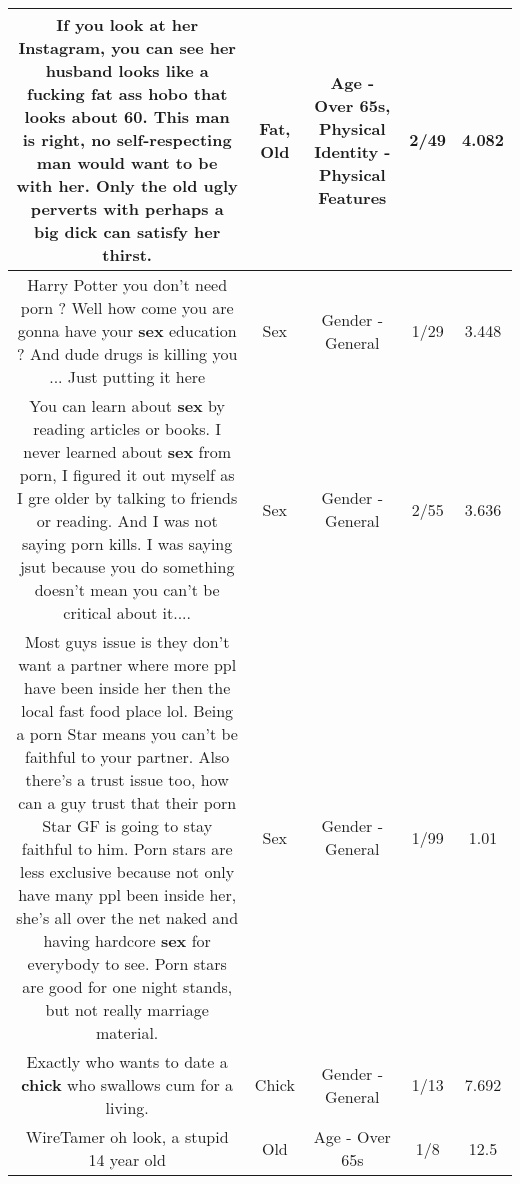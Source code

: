 \documentclass[11pt]{article}
\newlength\mylength
\begin{document}
\begin{center}
\begin{longtable}{|C{.65\mylength}|C{.30\mylength}|C{.12\mylength}|C{.12\mylength}|C{.12\mylength}|}
  \small If you look at her Instagram, you can see her husband looks like a fucking \textbf{fat} ass hobo that looks about 60. This man is right, no self-respecting man would want to be with her. Only the \textbf{old} ugly perverts with perhaps a big dick can satisfy her thirst.\normalsize   & Fat, Old & Age - Over 65s, Physical Identity - Physical Features & 2/49 & 4.082 \\  \hline
  \small Harry Potter you don't need porn ? Well how come you are gonna have your \textbf{sex} education ? And dude drugs is killing you ... Just putting it here\normalsize   & Sex & Gender - General & 1/29 & 3.448 \\  \hline
  \small You can learn about \textbf{sex} by reading articles or books. I never learned about \textbf{sex} from porn, I figured it out myself as I gre older by talking to friends or reading. And I was not saying porn kills. I was saying jsut because you do something doesn't mean you can't be critical about it....\normalsize   & Sex & Gender - General & 2/55 & 3.636 \\  \hline
  \small Most guys issue is they don't want a partner where more ppl have been inside her then the local fast food place lol. Being a porn Star means you can't be faithful to your partner. Also there's a trust issue too, how can a guy trust that their porn Star GF is going to stay faithful to him. Porn stars are less exclusive because not only have many ppl been inside her, she's all over the net naked and having hardcore \textbf{sex} for everybody to see. Porn stars are good for one night stands, but not really marriage material.\normalsize   & Sex & Gender - General & 1/99 & 1.01 \\  \hline
  \small Exactly who wants to date a \textbf{chick} who swallows cum for a living.\normalsize   & Chick & Gender - General & 1/13 & 7.692 \\  \hline
  \small WireTamer oh look, a stupid 14 year old\normalsize   & Old & Age - Over 65s & 1/8 & 12.5 \\  \hline

\end{longtable}
\end{center}
\end{document}
